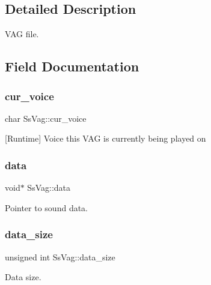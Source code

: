 \subsection{Detailed Description}
V\+AG file. 

\subsection{Field Documentation}
\mbox{\label{structSsVag_aab6f6eeadc95cb69ccb533e7eb3bfffa}} 
\subsubsection{\texorpdfstring{cur\+\_\+voice}{cur\_voice}}
{\footnotesize\ttfamily char Ss\+Vag\+::cur\+\_\+voice}



\mbox{[}Runtime\mbox{]} Voice this V\+AG is currently being played on 

\mbox{\label{structSsVag_a32e792329ffd00dac0bb87919ac19a75}} 
\subsubsection{\texorpdfstring{data}{data}}
{\footnotesize\ttfamily void$\ast$ Ss\+Vag\+::data}



Pointer to sound data. 

\mbox{\label{structSsVag_a5a90d2091bd45c5c0bae18ae1bbeed28}} 
\subsubsection{\texorpdfstring{data\+\_\+size}{data\_size}}
{\footnotesize\ttfamily unsigned int Ss\+Vag\+::data\+\_\+size}



Data size. 

\mbox{\label{structSsVag_aca71e6a5db585ab73a03d8f0743894e9}} 
